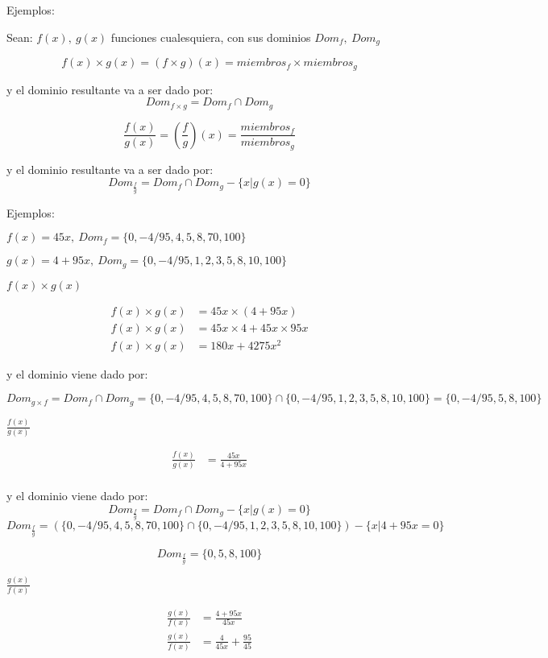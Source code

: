 Ejemplos:

Sean: $ f(x),\ g(x) $ funciones cualesquiera, con sus dominios $ Dom_f,\ Dom_g $

    $$ f(x) \times g(x)=(f \times g)(x)= miembros_f \times miembros_g $$

y el dominio resultante va a ser dado por:
    $$ Dom_{f\times g}= Dom_f \cap Dom_g $$

    $$ \frac{f(x)}{g(x)}=( \frac{f}{g})(x)= \frac{miembros_f}{miembros_g} $$

y el dominio resultante va a ser dado por:
    $$ Dom_{\frac{f}{g}}= Dom_f \cap Dom_g -\{x|g(x)=0\}$$

    Ejemplos:

    $ f(x)= 45x,\ Dom_f=\{0,-4/95,4,5,8,70,100\} $

    $ g(x)=4 +95x,\ Dom_g= \{0,-4/95, 1,2,3,5,8,10,100\}$


    $ f(x)\times g(x) $

    \begin{align*}
        f(x)\times g(x) &= 45x\times(4+95x)		\\
        f(x)\times g(x) &= 45x\times4 + 45x\times95x\\
        f(x)\times g(x) &= 180x+4275x^2
    \end{align*}

    y el dominio viene dado por:

    $$ Dom_{g\times f} = Dom_f \cap Dom_g =\{0,-4/95,4,5,8,70,100\} \cap \{0,-4/95,1,2,3,5,8,10,100\}=\{0,-4/95,5,8,100\} $$

    $ \frac{f(x)}{g(x)}  $

    \begin{align*}
        \frac{f(x)}{g(x)} &= \frac{45x}{4+95x} 		\\
    \end{align*}

    y el dominio viene dado por:
    $$ Dom_{\frac{f}{g}}= Dom_f \cap Dom_g -\{x|g(x)=0\}$$
    $$ Dom_{\frac{f}{g} } =  (\{0,-4/95,4,5,8,70,100\} \cap \{0,-4/95,1,2,3,5,8,10,100\}) -\{x|4+95x=0  \}$$

    $$Dom_{\frac{f}{g} }=\{0,5,8,100\} $$

$ \frac{g(x)}{f(x)}  $

    \begin{align*}
        \frac{g(x)}{f(x)} &= \frac{4+95x}{45x}		\\
        \frac{g(x)}{f(x)} &= \frac{4}{45x} +\frac{95}{45}
    \end{align*}

